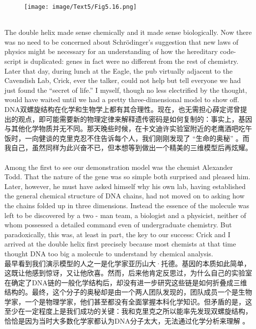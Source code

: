 \documentclass{article}
\begin{document}
\begin{figure}
    \centering
    \texttt{[image: image/Text5/Fig5.16.png]}
\end{figure}

\\
The double helix made sense chemically and it made sense biologically. Now there was no need to be concerned about Schrödinger’s suggestion that new laws of physics might be necessary for an understanding of how the hereditary code-script is duplicated: genes in fact were no different from the rest of chemistry. Later that day, during lunch at the Eagle, the pub virtually adjacent to the Cavendish Lab, Crick, ever the talker, could not help but tell everyone we had just found the “secret of life.” I myself, though no less electrified by the thought, would have waited until we had a pretty three-dimensional model to show off.\\
DNA双螺旋结构在化学和生物学上都有其合理性。现在，也无需担心薛定谔曾提出的观点，即可能需要新的物理定律来解释遗传密码是如何复制的：事实上，基因与其他化学物质并无不同。那天晚些时候，在卡文迪许实验室附近的老鹰酒吧吃午饭时，一向健谈的克里克忍不住告诉每个人，我们刚刚发现了 “生命的奥秘” 。而我自己，虽然同样为此兴奋不已，但本想等到做出一个精美的三维模型后再炫耀。 \\

\\
Among the first to see our demonstration model was the chemist Alexander Todd. That the nature of the gene was so simple both surprised and pleased him. Later, however, he must have asked himself why his own lab, having established the general chemical structure of DNA chains, had not moved on to asking how the chains folded up in three dimensions. Instead the essence of the molecule was left to be discovered by a two - man team, a biologist and a physicist, neither of whom possessed a detailed command even of undergraduate chemistry. But paradoxically, this was, at least in part, the key to our success: Crick and I arrived at the double helix first precisely because most chemists at that time thought DNA too big a molecule to understand by chemical analysis.\\
最早看到我们演示模型的人之一是化学家亚历山大·托德。基因的本质如此简单，这既让他感到惊讶，又让他欣喜。然而，后来他肯定反思过，为什么自己的实验室在确定了DNA链的一般化学结构后，却没有进一步研究这些链是如何折叠成三维结构的。最终，这个分子的奥秘却是由一个两人团队发现的，团队成员一个是生物学家，一个是物理学家，他们甚至都没有全面掌握本科化学知识。但矛盾的是，这至少在一定程度上是我们成功的关键：我和克里克之所以能率先发现双螺旋结构，恰恰是因为当时大多数化学家都认为DNA分子太大，无法通过化学分析来理解 。 \\
\end{document}
